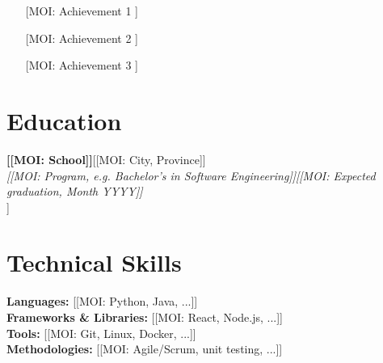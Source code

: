 \begin{itemize}
  \item [[MOI: Achievement 1]]
  \item [[MOI: Achievement 2]]
  \item [[MOI: Achievement 3]]
\end{itemize}

\section{Education}

\textbf{[[MOI: School]]}\hfill [[MOI: City, Province]]\\
\textit{[[MOI: Program, e.g. Bachelor's in Software Engineering]]}\hfill\textit{[[MOI: Expected graduation, Month YYYY]]}\\
[[MOI: Credits completed, GPA, awards… or delete this line]]

\section{Technical Skills}

\textbf{Languages:} [[MOI: Python, Java, ...]]\\[2.5pt]
\textbf{Frameworks \& Libraries:} [[MOI: React, Node.js, ...]]\\[2.5pt]
\textbf{Tools:} [[MOI: Git, Linux, Docker, ...]]\\[2.5pt]
\textbf{Methodologies:} [[MOI: Agile/Scrum, unit testing, ...]]



